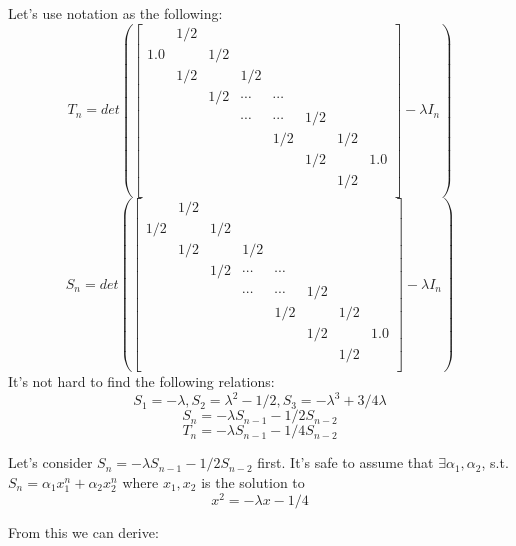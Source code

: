\documentclass{article}
\begin{document}
\begin{description}
	      Let's use notation as the following:
	      $$T_n = det(\begin{bmatrix}
			          & 1/2 &     &        &        &     &     &     \\
			      1.0 &     & 1/2 &        &        &     &     &     \\
			          & 1/2 &     & 1/2    &        &     &     &     \\
			          &     & 1/2 & \cdots & \cdots &     &     &     \\
			          &     &     & \cdots & \cdots & 1/2 &     &     \\
			          &     &     &        & 1/2    &     & 1/2 &     \\
			          &     &     &        &        & 1/2 &     & 1.0 \\
			          &     &     &        &        &     & 1/2 &     \\
		      \end{bmatrix} - \lambda I_n)$$
	      $$S_n = det(\begin{bmatrix}
			          & 1/2 &     &        &        &     &     &     \\
			      1/2 &     & 1/2 &        &        &     &     &     \\
			          & 1/2 &     & 1/2    &        &     &     &     \\
			          &     & 1/2 & \cdots & \cdots &     &     &     \\
			          &     &     & \cdots & \cdots & 1/2 &     &     \\
			          &     &     &        & 1/2    &     & 1/2 &     \\
			          &     &     &        &        & 1/2 &     & 1.0 \\
			          &     &     &        &        &     & 1/2 &     \\
		      \end{bmatrix} - \lambda I_n)$$
	      It's not hard to find the following relations:
	      $$S_1 = -\lambda, S_2 = \lambda^2 - 1/2, S_3 = -\lambda^3 + 3/4\lambda$$
	      $$S_n = -\lambda S_{n-1} - 1/2 S_{n-2}$$
	      $$T_n = -\lambda S_{n-1} - 1/4 S_{n-2}$$

	      Let's consider $S_n = -\lambda S_{n-1} - 1/2 S_{n-2}$ first.
	      It's safe to assume that $\exists \alpha_1, \alpha_2$, s.t. $S_n = \alpha_1x_1^n + \alpha_2x_2^n$ where $x_1, x_2$ is the solution to
	      $$x^2 = -\lambda x - 1/4$$

	      From this we can derive:


\end{description}
\end{document}
